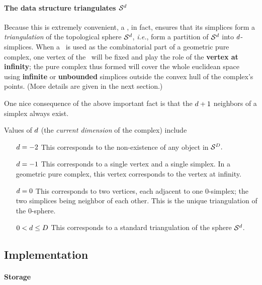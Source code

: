 {\newcommand{\sphere}{\ensuremath{\mathcal S}}

\paragraph{The data structure triangulates $\sphere^\cd$}

Because this is extremely convenient, a \pcds, in fact, ensures that its
simplices form a \emph{triangulation} of the topological sphere $\sphere^\cd$,
\emph{i.e.}, form a partition of $\sphere^\cd$ into $d$-simplices. When a
\pcds\ is used as the combinatorial part of a geometric pure complex, one
vertex of the \pcds\ will be fixed and play the role of the \textbf{vertex at
infinity}; the pure complex thus formed will cover the whole euclidean space
using \textbf{infinite} or \textbf{unbounded} simplices outside the convex
hull of the complex's points. (More details are given in the next section.)

One nice consequence of the above important fact is that the $d+1$ neighbors
of a simplex always exist.

Values of $d$ (the \emph{current dimension} of the complex) include
\begin{itemize}
\item[$d=-2$] This corresponds to the non-existence of any object in
$\sphere^\ad.$
\item[$d=-1$] This corresponds to a single vertex and a single simplex. In a
geometric pure complex, this vertex corresponds to the vertex at infinity.
\item[$d=0$] This corresponds to two vertices, each adjacent to one $0$-simplex;
the two simplices being neighbor of each other. This is the unique
triangulation of the $0$-sphere.
\item[$0<d\le D$] This corresponds to a standard triangulation of
the sphere $\sphere^\cd$.
\end{itemize}


\subsection{Implementation\label{pure_complex:pcds:impl}}

\paragraph{Storage}

}
